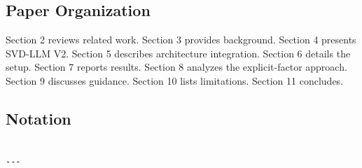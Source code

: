 \subsection{Paper Organization}

Section 2 reviews related work. Section 3 provides background. Section 4 
presents SVD-LLM V2. Section 5 describes architecture integration. Section 6 
details the setup. Section 7 reports results. Section 8 analyzes the 
explicit-factor approach. Section 9 discusses guidance. Section 10 lists 
limitations. Section 11 concludes.



\subsection{Notation}

\begin{lstlisting}

---
\end{lstlisting}